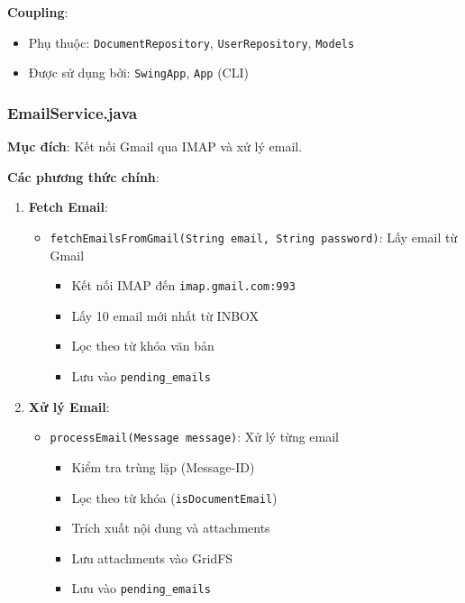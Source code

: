 \documentclass[12pt,a4paper]{article}
\begin{document}
\textbf{Coupling}:
\begin{itemize}
    \item Phụ thuộc: \texttt{DocumentRepository}, \texttt{UserRepository}, \texttt{Models}
    \item Được sử dụng bởi: \texttt{SwingApp}, \texttt{App} (CLI)
\end{itemize}

\subsubsection{EmailService.java}
\textbf{Mục đích}: Kết nối Gmail qua IMAP và xử lý email.

\textbf{Các phương thức chính}:

\begin{enumerate}
    \item \textbf{Fetch Email}:
    \begin{itemize}
        \item \texttt{fetchEmailsFromGmail(String email, String password)}: Lấy email từ Gmail
        \begin{itemize}
            \item Kết nối IMAP đến \texttt{imap.gmail.com:993}
            \item Lấy 10 email mới nhất từ INBOX
            \item Lọc theo từ khóa văn bản
            \item Lưu vào \texttt{pending\_emails}
        \end{itemize}
    \end{itemize}
    
    \item \textbf{Xử lý Email}:
    \begin{itemize}
        \item \texttt{processEmail(Message message)}: Xử lý từng email
        \begin{itemize}
            \item Kiểm tra trùng lặp (Message-ID)
            \item Lọc theo từ khóa (\texttt{isDocumentEmail})
            \item Trích xuất nội dung và attachments
            \item Lưu attachments vào GridFS
            \item Lưu vào \texttt{pending\_emails}
        \end{itemize}
    \end{itemize}
    

\end{enumerate}
\end{document}
